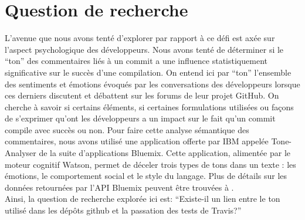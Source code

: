 \documentclass[10pt, conference]{IEEEtran}
\begin{document}
\section{Question de recherche}
\label{sec:rq}
L’avenue que nous avons tenté d’explorer par rapport à ce défi est axée sur l’aspect psychologique des développeurs. Nous avons tenté de déterminer si le “ton” des commentaires liés à un commit a une influence statistiquement significative sur le succès d’une compilation. On entend ici par “ton” l’ensemble des sentiments et émotions évoqués par les conversations des développeurs lorsque ces derniers discutent et débattent sur les forums de leur projet GitHub. On cherche à savoir si certains éléments, si certaines formulations utilisées ou façons de s’exprimer qu’ont les développeurs a un impact sur le fait qu’un commit compile avec succès ou non. Pour faire cette analyse sémantique des commentaires, nous avons utilisé une application offerte par IBM appelée Tone-Analyser de la suite d’applications Bluemix. Cette application, alimentée par le moteur cognitif Watson, permet de déceler trois types de tons dans un texte : les émotions, le comportement social et le style du langage. Plus de détails sur les données retournées par l'API Bluemix peuvent être trouvées à \cite{c1}. \\
Ainsi, la question de recherche explorée ici est: “Existe-il un lien entre le ton utilisé dans les dépôts github et la passation des tests de Travis?”
\end{document}
